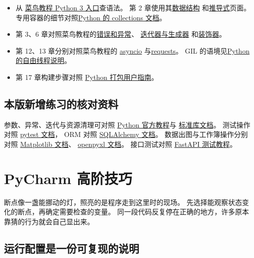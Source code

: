 \begin{itemize}
  \item 从 \href{https://www.runoob.com/python3}{菜鸟教程 Python 3 入口}查语法。
    第 2 章使用其\href{https://www.runoob.com/python3/python3-data-structure.html}{数据结构}
    和\href{https://www.runoob.com/python3/python-comprehensions.html}{推导式}页面。
    专用容器的细节对照\href{https://docs.python.org/3/library/collections.html}{Python 的 collections 文档}。
  \item 第 3、6 章对照菜鸟教程的\href{https://www.runoob.com/python3/python3-errors-execptions.html}{错误和异常}、
    \href{https://www.runoob.com/python3/python3-iterator-generator.html}{迭代器与生成器}
    和\href{https://www.runoob.com/python3/python-decorators.html}{装饰器}。
  \item 第 12、13 章分别对照菜鸟教程的
    \href{https://www.runoob.com/python3/python-asyncio.html}{asyncio}
    与\href{https://www.runoob.com/python3/python-requests.html}{requests}。
    GIL 的语境见\href{https://docs.python.org/3/howto/free-threading-python.html}{Python 的自由线程说明}。
  \item 第 17 章构建步骤对照
    \href{https://packaging.python.org/en/latest/tutorials/packaging-projects/}{Python 打包用户指南}。
\end{itemize}

\section*{本版新增练习的核对资料}
参数、异常、迭代与资源清理可对照
\href{https://docs.python.org/3/tutorial/}{Python 官方教程}与
\href{https://docs.python.org/3/library/}{标准库文档}。
测试操作对照 \href{https://docs.pytest.org/en/stable/}{pytest 文档}，
ORM 对照 \href{https://docs.sqlalchemy.org/}{SQLAlchemy 文档}。
数据出图与工作簿操作分别对照
\href{https://matplotlib.org/stable/}{Matplotlib 文档}、
\href{https://openpyxl.readthedocs.io/}{openpyxl 文档}。
接口测试对照 \href{https://fastapi.tiangolo.com/tutorial/testing/}{FastAPI 测试教程}。


\chapter{PyCharm 高阶技巧}

断点像一盏能挪动的灯，照亮的是程序走到这里时的现场。
先选择能观察状态变化的断点，再确定需要检查的变量。
同一段代码反复停在正确的地方，许多原本靠猜的行为就会自己显出来。

\section{运行配置是一份可复现的说明}

